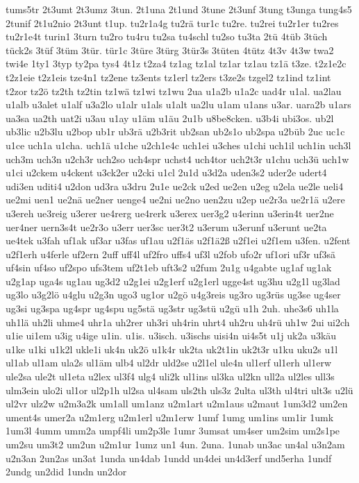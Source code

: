 {tums5tr
2t3umt
2t3umz
3tun.
2t1una
2t1und
3tune
2t3unf
3tung
t3unga
tung4s5
2tunif
2t1u2nio
2t3unt
t1up.
tu2r1a4g
tu2rä
tur1c
tu2re.
tu2rei
tu2r1er
tu2res
tu2r1e4t
turin1
3turn
tu2ro
tu4ru
tu2sa
tu4schl
tu2so
tu3ta
2tü
4tüb
3tüch
tück2s
3tüf
3tüm
3tür.
tür1c
3türe
3türg
3tür3s
3tüten
4tütz
4t3v
4t3w
twa2
twi4e
1ty1
3typ
ty2pa
tys4
4t1z
t2za4
tz1ag
tz1al
tz1ar
tz1au
tz1ä
t3ze.
t2z1e2c
t2z1eie
t2z1eis
tze4n1
tz2ene
tz3ents
tz1erl
tz2ers
t3ze2s
tzgel2
tz1ind
tz1int
t2zor
tz2ö
tz2th
tz2tin
tz1wä
tz1wi
tz1wu
2ua
u1a2b
u1a2c
uad4r
u1al.
ua2lau
u1alb
u3alet
u1alf
u3a2lo
u1alr
u1als
u1alt
ua2lu
u1am
u1ans
u3ar.
uara2b
u1ars
ua3sa
ua2th
uat2i
u3au
u1ay
u1äm
u1äu
2u1b
u8be8cken.
u3b4i
ubi3os.
ub2l
ub3lic
u2b3lu
u2bop
ub1r
ub3rä
u2b3rit
ub2san
ub2s1o
ub2spa
u2büb
2uc
uc1c
u1ce
uch1a
u1cha.
uch1ä
u1che
u2ch1e4c
uch1ei
u3ches
u1chi
uch1il
uch1in
uch3l
uch3m
uch3n
u2ch3r
uch2so
uch4spr
uchst4
uch4tor
uch2t3r
u1chu
uch3ü
uch1w
u1ci
u2ckem
u4ckent
u3ck2er
u2cki
u1cl
2u1d
u3d2a
uden3s2
uder2e
udert4
udi3en
uditi4
u2don
ud3ra
u3dru
2u1e
ue2ck
u2ed
ue2en
u2eg
u2ela
ue2le
ueli4
ue2mi
uen1
ue2nä
ue2ner
uenge4
ue2ni
ue2no
uen2zu
u2ep
ue2r3a
ue2r1ä
u2ere
u3ereh
ue3reig
u3erer
ue4rerg
ue4rerk
u3erex
uer3g2
u4erinn
u3erin4t
uer2ne
uer4ner
uern3s4t
ue2r3o
u3err
uer3sc
uer3t2
u3erum
u3erunf
u3erunt
ue2ta
ue4tek
u3fah
uf1ak
uf3ar
u3fas
uf1au
u2f1äs
u2f1ä2ß
u2f1ei
u2f1em
u3fen.
u2fent
u2f1erh
u4ferle
uf2ern
2uff
uff4l
uf2fro
uffs4
uf3l
u2fob
ufo2r
uf1ori
uf3r
uf3sä
uf4sin
uf4so
uf2spo
ufs3tem
uf2t1eb
uft3s2
u2fum
2u1g
u4gabte
ug1af
ug1ak
u2g1ap
uga4s
ug1au
ug3d2
u2g1ei
u2g1erf
u2g1erl
ugge4st
ug3hu
u2g1l
ug3lad
ug3lo
u3g2lö
u4glu
u2g3n
ugo3
ug1or
u2gö
u4g3reis
ug3ro
ug3rüs
ug3se
ug4ser
ug3si
ug3spa
ug4spr
ug4spu
ug5stä
ug3str
ug3stü
u2gü
u1h
2uh.
uhe3s6
uh1la
uh1lä
uh2li
uhme4
uhr1a
uh2rer
uh3ri
uh4rin
uhrt4
uh2ru
uh4rü
uh1w
2ui
ui2ch
u1ie
ui1em
u3ig
u4ige
u1in.
u1is.
u3isch.
u3ischs
uisi4n
ui4s5t
u1j
uk2a
u3käu
u1ke
u1ki
u1k2l
ukle1i
uk4n
uk2ö
u1k4r
uk2ta
uk2t1in
uk2t3r
u1ku
uku2s
u1l
ul1ab
ul1am
ula2s
ul1äm
ulb4
ul2dr
uld2se
u2l1el
ule4n
ul1erf
ul1erh
ul1erw
ule2sa
ule2t
ul1eta
u2lex
ul3f4
ulg4
uli2k
ul1ins
ul3ka
ul2kn
ull2a
ul2les
ull3s
ulm3ein
ulo2i
ul1or
ul2p1h
ul2sa
ul4sam
uls2th
uls3z
2ulta
ul3th
ul4tri
ult3s
u2lü
ul2vr
ulz2w
u2m3a2k
um1all
um1anz
u2m1art
u2m1aus
u2maut
1um3d2
um2en
ument4s
umer2a
u2m1erg
u2m1erl
u2m1erw
1umf
1umg
um1ins
um1ir
1umk
1um3l
4umm
umm2a
umpf4li
um2p3le
1umr
3umsat
um4ser
um2sim
um2s1pe
um2su
um3t2
um2un
u2m1ur
1umz
un1
4un.
2una.
1unab
un3ac
un4al
u3n2am
u2n3an
2un2as
un3at
1unda
un4dab
1undd
un4dei
un4d3erf
und5erha
1undf
2undg
un2did
1undn
un2dor
}
